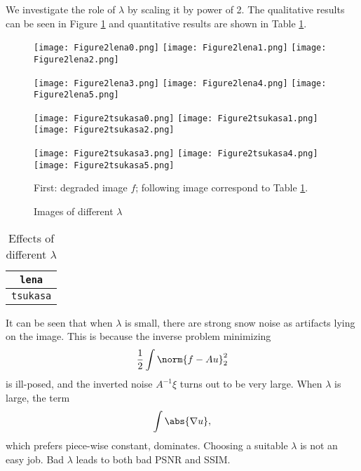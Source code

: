 \documentclass[english, nochinese]{pnote}
\begin{document}
We investigate the role of $\lambda$ by scaling it by power of 2. The qualitative results can be seen in Figure \ref{Fig:Lambda} and quantitative results are shown in Table \ref{Tbl:Lambda}.

\begin{figure}[htbp]
{
\centering

\texttt{[image: Figure2lena0.png]}
\texttt{[image: Figure2lena1.png]}
\texttt{[image: Figure2lena2.png]}

\texttt{[image: Figure2lena3.png]}
\texttt{[image: Figure2lena4.png]}
\texttt{[image: Figure2lena5.png]}

\texttt{[image: Figure2tsukasa0.png]}
\texttt{[image: Figure2tsukasa1.png]}
\texttt{[image: Figure2tsukasa2.png]}

\texttt{[image: Figure2tsukasa3.png]}
\texttt{[image: Figure2tsukasa4.png]}
\texttt{[image: Figure2tsukasa5.png]}

\caption{Images of different $\lambda$}
\label{Fig:Lambda}
}
{
\footnotesize First: degraded image $f$; following image correspond to Table \ref{Tbl:Lambda}.
}
\end{figure}

\begin{table}[htbp]
\centering
\begin{tabular}{|c|c|c|c|c|c|c|}
\hline
\multicolumn{7}{|c|}{\texttt{lena}} \\
\hline

\multicolumn{7}{|c|}{\texttt{tsukasa}} \\
\hline

\end{tabular}
\caption{Effects of different $\lambda$}
\label{Tbl:Lambda}
\end{table}

It can be seen that when $\lambda$ is small, there are strong snow noise as artifacts lying on the image. This is because the inverse problem minimizing
\begin{equation}
\frac{1}{2} \int \norm{ f - A u }_2^2
\end{equation}
is ill-posed, and the inverted noise $ A^{-1} \xi $ turns out to be very large. When $\lambda$ is large, the term
\begin{equation}
\int \abs{ \nabla u },
\end{equation}
which prefers piece-wise constant, dominates. Choosing a suitable $\lambda$ is not an easy job. Bad $\lambda$ leads to both bad PSNR and SSIM.
\end{document}
